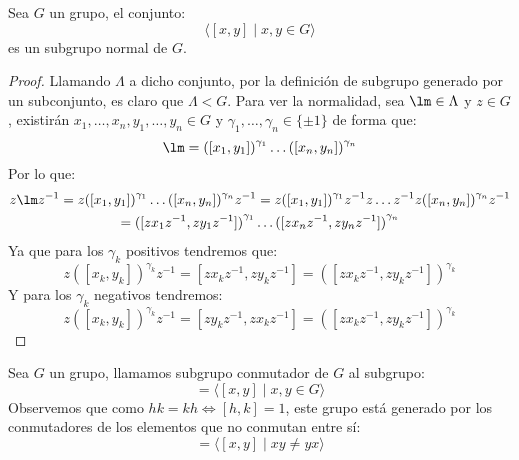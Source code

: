 \begin{prop}
    Sea $G$ un grupo, el conjunto:
    \begin{equation*}
        \langle [x,y] \mid x,y\in G \rangle 
    \end{equation*}
    es un subgrupo normal de $G$.
    \begin{proof}
        Llamando $\Lambda$ a dicho conjunto, por la definición de subgrupo generado por un subconjunto, es claro que $\Lambda < G$. Para ver la normalidad, sea $\lm \in \Lambda$ y $z\in G$, existirán $x_1,\ldots,x_n,y_1,\ldots,y_n \in G$ y $\gamma_1,\ldots,\gamma_n\in \{\pm 1\}$ de forma que:
        \begin{equation*}
            \lm = {([x_1,y_1])}^{\gamma_1} \ldots {([x_n,y_n])}^{\gamma_n}
        \end{equation*}
        Por lo que:
        \begin{multline*}
            z\lm z^{-1} = z{([x_1,y_1])}^{\gamma_1} \ldots {([x_n,y_n])}^{\gamma_n}z^{-1} = z{([x_1,y_1])}^{\gamma_1}z^{-1}z \ldots z^{-1}z{([x_n,y_n])}^{\gamma_n}z^{-1} \\
            = {([zx_1z^{-1}, zy_1z^{-1}])}^{\gamma_1} \ldots {([zx_nz^{-1}, zy_nz^{-1}])}^{\gamma_n}
        \end{multline*}
        Ya que para los $\gamma_k$ positivos tendremos que:
        \begin{equation*}
            z{([x_k,y_k])}^{\gamma_k}z^{-1} = [zx_kz^{-1}, zy_kz^{-1}] = {([zx_kz^{-1}  ,zy_kz^{-1}  ])}^{\gamma_k}
        \end{equation*}
        Y para los $\gamma_k$ negativos tendremos:
        \begin{equation*}
            z{([x_k,y_k])}^{\gamma_k}z^{-1} = [zy_kz^{-1}, zx_kz^{-1}] = {([zx_kz^{-1} ,zy_kz^{-1} ])}^{\gamma_k}
        \end{equation*}
    \end{proof}
\end{prop}

\begin{definicion}
    Sea $G$ un grupo, llamamos subgrupo conmutador de $G$ al subgrupo:
    \begin{equation*}
        [G,G] = \langle [x,y] \mid x,y\in G\rangle 
    \end{equation*}
    Observemos que como $hk = kh \Longleftrightarrow [h,k] = 1$, este grupo está generado por los conmutadores de los elementos que no conmutan entre sí:
    \begin{equation*}
        [G,G] = \langle [x,y] \mid xy \neq yx \rangle
    \end{equation*}
\end{definicion}

